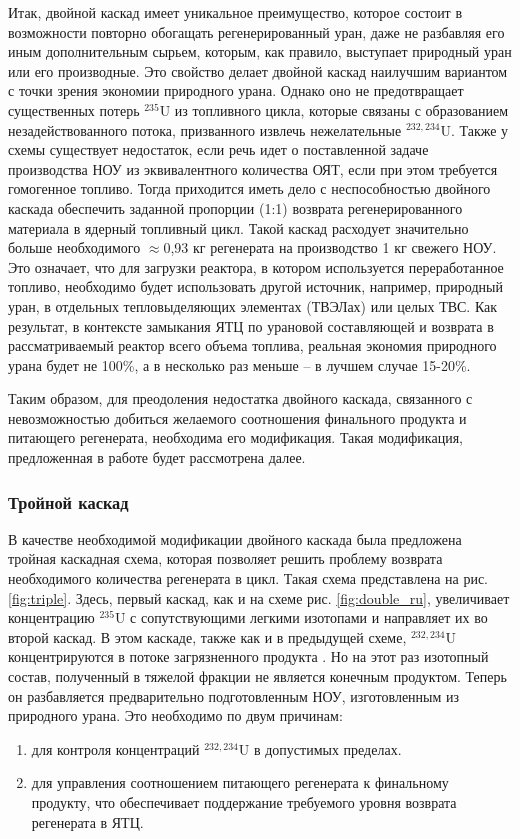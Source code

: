 Итак, двойной каскад имеет уникальное преимущество, которое состоит в возможности повторно обогащать регенерированный уран, даже не разбавляя его иным дополнительным сырьем, которым, как правило, выступает природный уран или его производные.
Это свойство делает двойной каскад наилучшим вариантом с точки зрения экономии природного урана.
Однако оно не предотвращает существенных потерь $^{235}$U из топливного цикла, которые связаны с образованием незадействованного потока, призванного извлечь нежелательные $^{232,234}$U.
Также у схемы существует недостаток, если речь идет о поставленной задаче производства НОУ из эквивалентного количества ОЯТ, если при этом требуется гомогенное топливо.
Тогда приходится иметь дело с неспособностью двойного каскада обеспечить заданной пропорции (1:1) возврата регенерированного материала в ядерный топливный цикл.
Такой каскад расходует значительно больше необходимого $\approx$0,93 кг регенерата на производство 1 кг свежего НОУ.
Это означает, что для загрузки реактора, в котором используется переработанное топливо, необходимо будет использовать другой источник, например, природный уран, в отдельных тепловыделяющих элементах (ТВЭЛах) или целых ТВС. 
Как результат, в контексте замыкания ЯТЦ по урановой составляющей и возврата в рассматриваемый реактор всего объема топлива, реальная экономия природного урана будет не 100\%, а в несколько раз меньше -- в лучшем случае 15-20\%.

Таким образом, для преодоления недостатка двойного каскада, связанного с невозможностью добиться желаемого соотношения финального продукта и питающего регенерата, необходима его модификация.
Такая модификация, предложенная в работе \cite{smirnovObogashchenieRegenerirovannogoUrana2018}
будет рассмотрена далее.

\subsubsection{Тройной каскад}
В качестве необходимой модификации двойного каскада была предложена тройная каскадная схема, которая позволяет решить проблему возврата необходимого количества регенерата в цикл.
Такая схема представлена на рис. \ref{fig:triple}.
Здесь, первый каскад, как и на схеме рис. \ref{fig:double_ru}, увеличивает концентрацию $^{235}$U с сопутствующими легкими изотопами и направляет их во второй каскад.
В этом каскаде, также как и в предыдущей схеме, $^{232,234}$U концентрируются в потоке загрязненного продукта \cite{smirnovObogashchenieRegenerirovannogoUrana2018}.
Но на этот раз изотопный состав, полученный в тяжелой фракции не является конечным продуктом. 
Теперь он разбавляется предварительно подготовленным НОУ, изготовленным из природного урана.
Это необходимо по двум причинам:
\begin{enumerate}
  \item для контроля концентраций $^{232,234}$U в допустимых пределах.
  \item для управления соотношением питающего регенерата к финальному продукту, что обеспечивает поддержание требуемого уровня возврата регенерата в ЯТЦ.
\end{enumerate}

